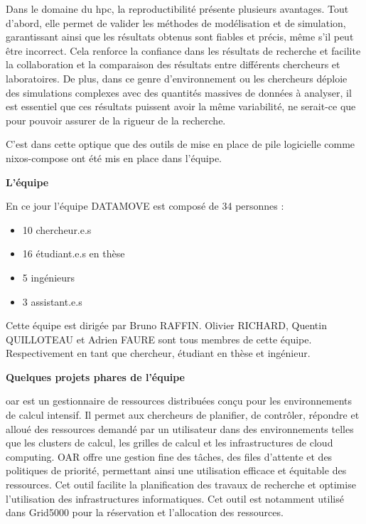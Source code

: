 \documentclass[a4paper,french,12pt, titlepage]{article}
\begin{document}
Dans le domaine du \Gls{hpc}, la reproductibilité présente plusieurs
avantages. Tout d'abord, elle permet de valider les méthodes de
modélisation et de simulation, garantissant ainsi que les résultats
obtenus sont fiables et précis, même s'il peut être incorrect. Cela
renforce la confiance dans les résultats de recherche et facilite la
collaboration et la comparaison des résultats entre différents
chercheurs et laboratoires. De plus, dans ce genre d'environnement ou
les chercheurs déploie des simulations complexes avec des quantités
massives de données à analyser, il est essentiel que ces résultats
puissent avoir la même variabilité, ne serait-ce que pour pouvoir
assurer de la rigueur de la recherche.\newline

C'est dans cette optique que des outils de mise en place de pile
logicielle comme \Gls{nixos-compose} ont été mis en place dans
l'équipe.\newline

\textbf{L'équipe}\newline

En ce jour l'équipe DATAMOVE est composé de 34 personnes :

\begin{itemize}
\item
  10 chercheur.e.s
\item
  16 étudiant.e.s en thèse
\item
  5 ingénieurs
\item
  3 assistant.e.s\newline
\end{itemize}

Cette équipe est dirigée par Bruno RAFFIN. Olivier RICHARD, Quentin
QUILLOTEAU et Adrien FAURE sont tous membres de cette équipe.
Respectivement en tant que chercheur, étudiant en thèse et
ingénieur.\newline

\textbf{Quelques projets phares de l'équipe}\newline

\Gls{oar} est un gestionnaire de ressources distribuées conçu pour les
environnements de calcul intensif. Il permet aux chercheurs de
planifier, de contrôler, répondre et alloué des ressources demandé par
un utilisateur dans des environnements telles que les clusters de
calcul, les grilles de calcul et les infrastructures de cloud computing.
OAR offre une gestion fine des tâches, des files d'attente et des
politiques de priorité, permettant ainsi une utilisation efficace et
équitable des ressources. Cet outil facilite la planification des
travaux de recherche et optimise l'utilisation des infrastructures
informatiques. Cet outil est notamment utilisé dans Grid5000 pour la
réservation et l'allocation des ressources.\newline
\end{document}

